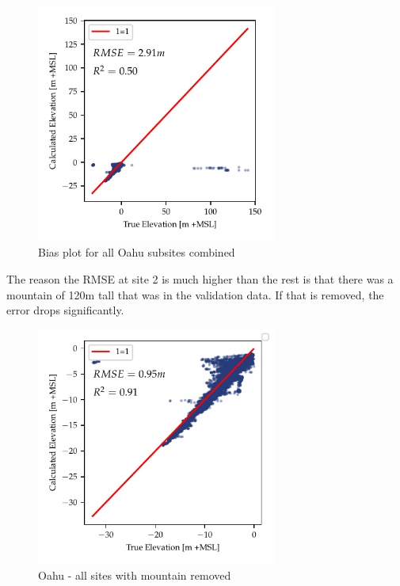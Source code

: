 \begin{figure}[h]
    \centering
    \includegraphics[width=0.7\textwidth]{figures/Oahu_combined_lidar_estimated_vs_truth.pdf}
    \caption{Bias plot for all Oahu subsites combined}
    \label{fig:oahu-all-bias-plot}
\end{figure}

The reason the RMSE at site 2 is much higher than the rest is that there was a mountain of 120m tall that was in the validation data. If that is removed, the error drops significantly. 
\begin{figure}[h]
    \centering
    \includegraphics[width=0.7\textwidth]{figures/Oahu_combined_mountains_removed_lidar_estimated_vs_truth.pdf}
    \caption{Oahu - all sites with mountain removed}
    \label{fig:oahu-bias-no-mountains}
\end{figure}

